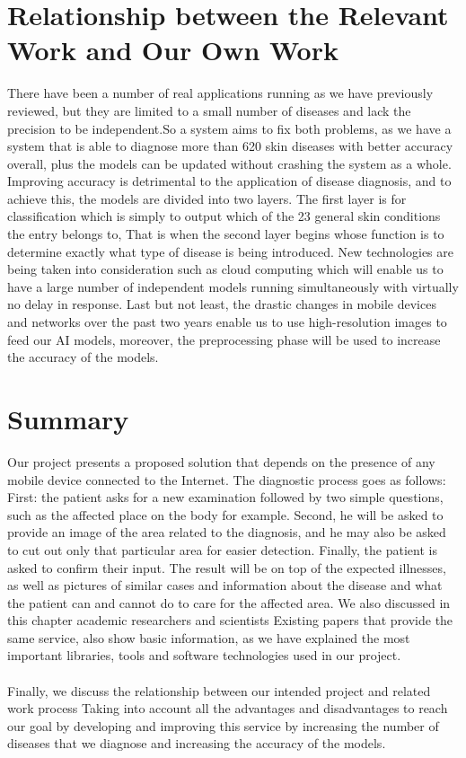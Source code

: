 \documentclass{article}
\begin{document}
\section{Relationship between the Relevant Work and Our Own Work }
There have been a number of real applications running as we have previously reviewed, but they are limited to a small number of diseases and lack the precision to be independent.So a system aims to fix both problems, as we have a system that is able to diagnose more than 620 skin diseases with better accuracy overall, plus the models can be updated without crashing the system as a whole.
Improving accuracy is detrimental to the application of disease diagnosis, and to achieve this, the models are divided into two layers.
The first layer is for classification which is simply to output which of the 23 general skin conditions the entry belongs to,
That is when the second layer begins whose function is to determine exactly what type of disease is being introduced.
New technologies are being taken into consideration such as cloud computing which will enable us to have a large number of independent models running simultaneously with virtually no delay in response.
Last but not least, the drastic changes in mobile devices and networks over the past two years enable us to use high-resolution images to feed our AI models, moreover, the preprocessing phase will be used to increase the accuracy of the models.

\section{Summary }
Our project presents a proposed solution that depends on the presence of any mobile device connected to the Internet.
The diagnostic process goes as follows:
First: the patient asks for a new examination followed by two simple questions, such as the affected place on the body for example.
Second, he will be asked to provide an image of the area related to the diagnosis, and he may also be asked to cut out only that particular area for easier detection.
Finally, the patient is asked to confirm their input.
The result will be on top of the expected illnesses, as well as pictures of similar cases and information about the disease and what the patient can and cannot do to care for the affected area.
We also discussed in this chapter academic researchers and scientists
Existing papers that provide the same service, also show basic information, as we have explained the most important libraries, tools and software technologies used in our project.\\\\
Finally, we discuss the relationship between our intended project and related work process
Taking into account all the advantages and disadvantages to reach our goal by developing and improving this service by increasing the number of diseases that we diagnose and increasing the accuracy of the models.


\end{document}
